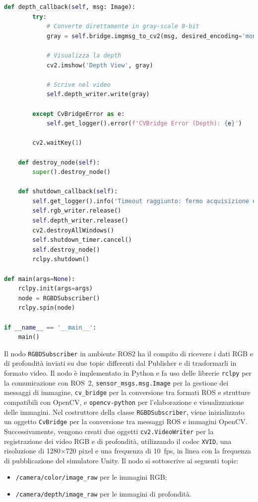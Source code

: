 \documentclass[11pt]{report}
\begin{document}
\begin{lstlisting}[language=Python, caption=Subscriber RGB-D ROS2 con salvataggio video, label=lst:rgbd_subscriber]
    def depth_callback(self, msg: Image):
        try:
            # Converte direttamente in gray-scale 8-bit
            gray = self.bridge.imgmsg_to_cv2(msg, desired_encoding='mono8')

            # Visualizza la depth
            cv2.imshow('Depth View', gray)

            # Scrive nel video
            self.depth_writer.write(gray)

        except CvBridgeError as e:
            self.get_logger().error(f'CVBridge Error (Depth): {e}')

        cv2.waitKey(1)

    def destroy_node(self):
        super().destroy_node()

    def shutdown_callback(self):
        self.get_logger().info('Timeout raggiunto: fermo acquisizione e chiudo finestre.')
        self.rgb_writer.release()
        self.depth_writer.release()
        cv2.destroyAllWindows()
        self.shutdown_timer.cancel()
        self.destroy_node()
        rclpy.shutdown()

def main(args=None):
    rclpy.init(args=args)
    node = RGBDSubscriber()
    rclpy.spin(node)

if __name__ == '__main__':
    main()
\end{lstlisting}
\vspace{1em} %
Il nodo \texttt{RGBDSubscriber} in ambiente ROS2 ha il compito di ricevere i dati RGB e di profondità inviati su due topic differenti dal Publisher e di trasformarli in formato video. Il nodo è implementato in Python e fa uso delle librerie \texttt{rclpy} per la comunicazione con ROS~2, \texttt{sensor\_msgs.msg.Image} per la gestione dei messaggi di immagine, \texttt{cv\_bridge} per la conversione tra formati ROS e strutture compatibili con OpenCV, e \texttt{opencv-python} per l’elaborazione e visualizzazione delle immagini.
\newline
Nel costruttore della classe \texttt{RGBDSubscriber}, viene inizializzato un oggetto \texttt{CvBridge} per la conversione tra messaggi ROS e immagini OpenCV. Successivamente, vengono creati due oggetti \texttt{cv2.VideoWriter} per la registrazione dei video RGB e di profondità, utilizzando il codec \texttt{XVID}, una risoluzione di 1280$\times$720 pixel e una frequenza di 10~fps, in linea con la frequenza di pubblicazione del simulatore Unity.
\newline
Il nodo si sottoscrive ai seguenti topic:
\begin{itemize}
  \item \texttt{/camera/color/image\_raw} per le immagini RGB;
  \item \texttt{/camera/depth/image\_raw} per le immagini di profondità.
\end{itemize}
\end{document}
